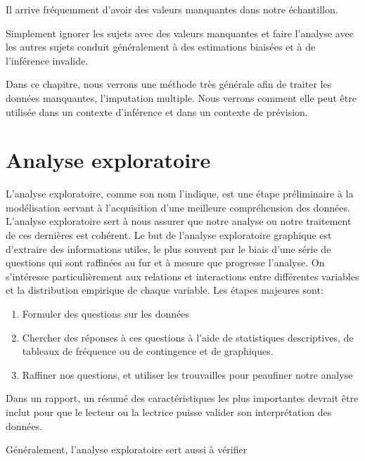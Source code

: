 \documentclass[
  11pt,
  letterpaper,
]{scrbook}
\providecommand{\tightlist}{%
  \setlength{\itemsep}{0pt}\setlength{\parskip}{0pt}}\usepackage{longtable,booktabs,array}
\theoremstyle{definition}
\theoremstyle{remark}
\begin{document}
Il arrive fréquemment d'avoir des valeurs manquantes dans notre
échantillon.

Simplement ignorer les sujets avec des valeurs manquantes et faire
l'analyse avec les autres sujets conduit généralement à des estimations
biaisées et à de l'inférence invalide.

Dans ce chapitre, nous verrons une méthode très générale afin de traiter
les données manquantes, l'imputation multiple. Nous verrons comment elle
peut être utilisée dans un contexte d'inférence et dans un contexte de
prévision.


\hypertarget{analyse-exploratoire}{%
\chapter{Analyse exploratoire}\label{analyse-exploratoire}}

L'analyse exploratoire, comme son nom l'indique, est une étape
préliminaire à la modélisation servant à l'acquisition d'une meilleure
compréhension des données. L'analyse exploratoire sert à nous assurer
que notre analyse ou notre traitement de ces dernières est cohérent. Le
but de l'analyse exploratoire graphique est d'extraire des informations
utiles, le plus souvent par le biais d'une série de questions qui sont
raffinées au fur et à mesure que progresse l'analyse. On s'intéresse
particulièrement aux relations et interactions entre différentes
variables et la distribution empirique de chaque variable. Les étapes
majeures sont:

\begin{enumerate}
\def\labelenumi{\arabic{enumi}.}
\tightlist
\item
  Formuler des questions sur les données
\item
  Chercher des réponses à ces questions à l'aide de statistiques
  descriptives, de tableaux de fréquence ou de contingence et de
  graphiques.
\item
  Raffiner nos questions, et utiliser les trouvailles pour peaufiner
  notre analyse
\end{enumerate}

Dans un rapport, un résumé des caractéristiques les plus importantes
devrait être inclut pour que le lecteur ou la lectrice puisse valider
son interprétation des données.

Généralement, l'analyse exploratoire sert aussi à vérifier
\end{document}
